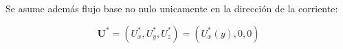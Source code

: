 

\iffalse
\begin{equation}
\boxed{
\begin{array}{l}
    \nabla^* \cdot \tilde{\mathbf{u}}^* = 0 \\
    \frac{\partial \tilde{\mathbf{u}}^*}{\partial t^*} + \tilde{\mathbf{u}}^* \cdot \nabla^* \mathbf{U^*} + \mathbf{U^*} \cdot \nabla^*  \tilde{\mathbf{u}}^* = 
    -\nabla^* \tilde{\text{p}}^* + \frac{1}{\text{Re}_o} \hspace{0.5mm} \nabla^{*2} \tilde{\mathbf{u}}^* + \text{Ri}_o \hspace{0.5mm} \tilde{\theta}^* \hspace{0.5mm} \mathbf{\hat{g}} \\
    \frac{\partial \tilde{\theta}^*}{\partial t^*} + \mathbf{U^*} \cdot \nabla^* \tilde{\theta}^* + \tilde{\mathbf{u}}^* \cdot \nabla^* \Theta^* = 
    \frac{1}{\text{Pr}}\hspace{0.5mm}  \frac{1}{\text{Re}_o} \hspace{0.5mm} \nabla^{*2} \hspace{0.5mm} \tilde{\theta}^* + \tilde{u^*_x} 
\end{array}
}
\label{eq:gob_system_adim_perturb}
\end{equation} 
\fi

Se asume además flujo base no nulo unicamente en la dirección de la corriente: 

\begin{equation*}
\mathbf{U^*} = (U^*_x, U^*_y, U^*_z) = (U^*_x(y),0,0)
\end{equation*}

